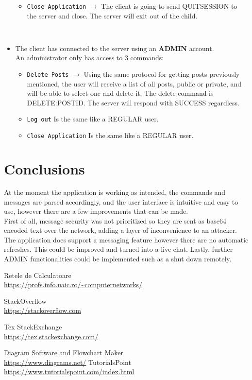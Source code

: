 \documentclass[runningheads, a4paper]{llncs}
\begin{document}
\begin{itemize}
\begin{itemize}
        \item \texttt{Close Application} $\rightarrow$ The client is going to send QUITSESSION to the server and close. The server will exit out of the child.
    \end{itemize}
    \hfill \\
    \item The client has connected to the server using an \textbf{ADMIN} account. \\
    An administrator only has access to 3 commands:
    \begin{itemize}
        \item \texttt{Delete Posts} $\rightarrow$ Using the same protocol for getting posts previously mentioned, the user will receive a list of all posts, public or private, and will be able to select one and delete it. The delete command is DELETE:POSTID. The server will respond with SUCCESS regardless.
        \item \texttt{Log out} Is the same like a REGULAR user.
        \item \texttt{Close Application} Is the same like a REGULAR user.
    \end{itemize}
\end{itemize}
\newpage
\section{Conclusions}
At the moment the application is working as intended, the commands and messages are parsed accordingly, and the user interface is intuitive and easy to use, however there are a few improvements that can be made.\\ First of all, message security was not prioritized so they are sent as base64 encoded text over the network, adding a layer of inconvenience to an attacker. \\
The application does support a messaging feature however there are no automatic refreshes. This could be improved and turned into a live chat.
Lastly, further ADMIN functionalities could be implemented such as a shut down remotely.
\begin{thebibliography}{}
Retele de Calculatoare\\
\url{https://profs.info.uaic.ro/~computernetworks/}

StackOverflow \\
\url{https://stackoverflow.com}

Tex StackExchange \\
\url{https://tex.stackexchange.com/}

Diagram Software and Flowchart Maker \\
\url{https://www.diagrams.net/}
TutorialsPoint\\
\url{https://www.tutorialspoint.com/index.html}
\end{thebibliography}
\end{document}
